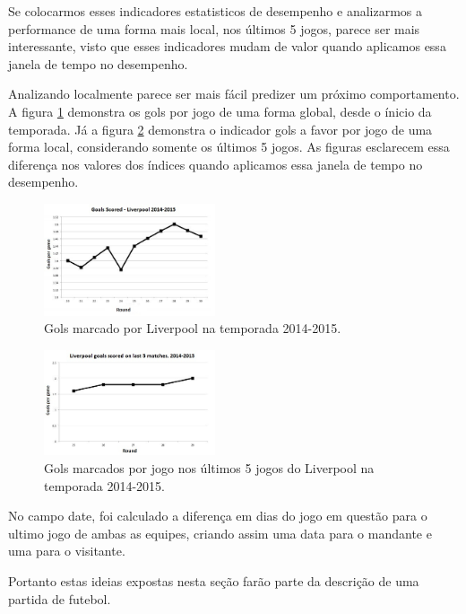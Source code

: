 \documentclass{article}
\begin{document}
Se colocarmos esses indicadores estatisticos de desempenho e analizarmos a performance de uma forma mais local, nos últimos 5 jogos, parece ser mais interessante, visto que esses indicadores mudam de valor quando aplicamos essa janela de tempo no desempenho.

Analizando localmente parece ser mais fácil predizer um próximo comportamento. A figura \ref{fig:liv_goals_scored}
demonstra os gols por jogo de uma forma global, desde o ínicio da temporada. Já a figura \ref{fig:liv_goals_scored5} demonstra o indicador gols a favor por jogo de uma forma local, considerando somente os últimos 5 jogos. As figuras esclarecem essa diferença nos valores dos índices quando aplicamos essa janela de tempo no desempenho.

\begin{figure}[!h]
	\centering
	\includegraphics[width=0.45\textwidth]{./04-figuras/Gols_feitos.JPG}
	\caption{Gols marcado por Liverpool na temporada 2014-2015.}
	\label{fig:liv_goals_scored}
\end{figure}

\begin{figure}[!h]
	\centering
	\includegraphics[width=0.45\textwidth]{./04-figuras/Gols_feitos_5jogos.JPG}
	\caption{Gols marcados por jogo nos últimos 5 jogos do Liverpool na temporada 2014-2015.}
	\label{fig:liv_goals_scored5}
\end{figure}


No campo date, foi calculado a diferença em dias do jogo em questão para o ultimo jogo de ambas as equipes, criando assim uma data para o mandante e uma para o visitante.

Portanto estas ideias expostas nesta seção farão parte da descrição de uma partida de futebol.
\end{document}
